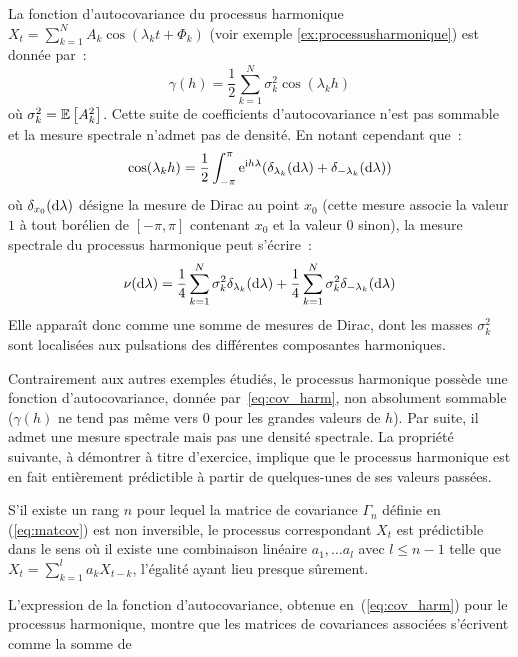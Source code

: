 \begin{example}
La fonction d'autocovariance du processus harmonique $X_{t} =
\sum_{k=1}^N A_k \cos(\lambda_k t + \Phi_k )$ (voir exemple
\ref{ex:processusharmonique}) est donn\'ee par~:
\begin{equation}
 \label{eq:cov_harm}
 \gamma(h) = \frac{1}{2} \sum_{k=1}^N \sigma_k^2
  \cos ( \lambda_k h)
\end{equation}
o\`u $\sigma_k^2={\mathbb E}\left[ A_k^2 \right]$. Cette suite de coefficients
d'autocovariance n'est pas sommable et la mesure spectrale n'admet
pas de densit\'e. En notant cependant que~:
\[
 \cos(\lambda_k h)
 = \frac{1}{2} \int_{- \pi}^{\pi} \mathrm{e}^{\mathrm{i}  h \lambda}
 (\delta_{\lambda_k}(\mathrm{d}\lambda) + \delta_{-\lambda_k}(\mathrm{d}\lambda))
\]
o\`u $\delta_{x_0}(\mathrm{d}\lambda)$ d\'esigne la mesure de Dirac au
point $x_0$ (cette mesure associe la valeur $1$ \`a tout bor\'elien de
$[-\pi,\pi]$ contenant $x_0$ et la valeur $0$ sinon), la mesure
spectrale du processus harmonique peut s'\'ecrire~:
\[
 \nu(\mathrm{d}\lambda)=
    \frac{1}{4} \sum_{k=1}^N \sigma_k^2 \delta_{\lambda_k}(\mathrm{d}\lambda)
    +
    \frac{1}{4} \sum_{k=1}^N \sigma_k^2 \delta_{-\lambda_k}(\mathrm{d}\lambda)
\]
Elle appara\^{i}t donc comme une somme de mesures de Dirac, dont
les masses $\sigma_k^2$ sont localis\'ees aux pulsations des
diff\'erentes composantes harmoniques.
\end{example}
Contrairement aux autres exemples
\'etudi\'es, le processus harmonique poss\`ede une fonction d'autocovariance, donn\'ee
par~\ref{eq:cov_harm}, non absolument sommable ($\gamma(h)$ ne
tend pas m\^{e}me vers 0 pour les grandes valeurs de $h$). Par suite, il admet une mesure spectrale mais pas une densit\'e
spectrale. La propri\'et\'e suivante, \`a d\'emontrer \`a titre d'exercice,
implique que le processus harmonique est en fait enti\`erement
pr\'edictible \`a partir de quelques-unes de ses valeurs pass\'ees.
\begin{proposition}
  S'il existe un rang $n$ pour lequel la matrice de covariance $\Gamma_n$
  d\'efinie en (\ref{eq:matcov}) est non inversible, le processus correspondant
  $X_t$ est pr\'edictible dans le sens o\`u il existe une combinaison lin\'eaire
  $a_1, \dots a_{l}$ avec $l \leq n-1$ telle que $X_t = \sum_{k=1}^l a_k
  X_{t-k}$, l'\'egalit\'e ayant lieu presque s\^urement.
\end{proposition}
L'expression de la fonction d'autocovariance, obtenue
en~(\ref{eq:cov_harm}) pour le processus harmonique, montre que
les matrices de covariances associ\'ees s'\'ecrivent comme la somme de
